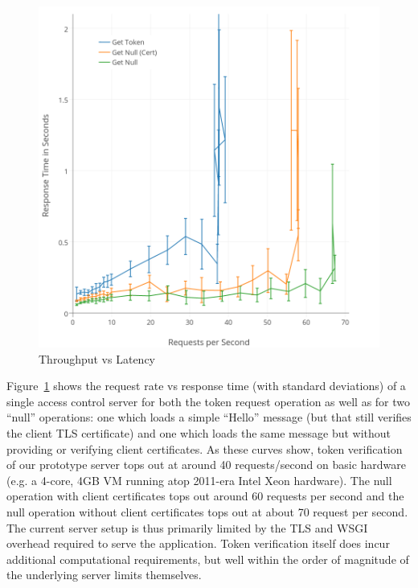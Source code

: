 \begin{figure}[th]
  \centering
  \includegraphics[width=\columnwidth]{./figs/png/chart-iops.png}
  \caption{Throughput vs Latency}
  \label{fig:eval:iops}
\end{figure}

Figure~\ref{fig:eval:iops} shows the request rate vs response time
(with standard deviations) of a single access control server for both
the token request operation as well as for two ``null'' operations:
one which loads a simple ``Hello'' message (but that still verifies
the client TLS certificate) and one which loads the same message but
without providing or verifying client certificates. As these curves
show, token verification of our prototype server tops out at around 40
requests/second on basic hardware (e.g. a 4-core, 4GB VM running atop
2011-era Intel Xeon hardware). The null operation with client
certificates tops out around 60 requests per second and the null
operation without client certificates tops out at about 70 request per
second. The current server setup is thus primarily limited by the TLS
and WSGI overhead required to serve the application. Token
verification itself does incur additional computational requirements,
but well within the order of magnitude of the underlying server limits
themselves.


